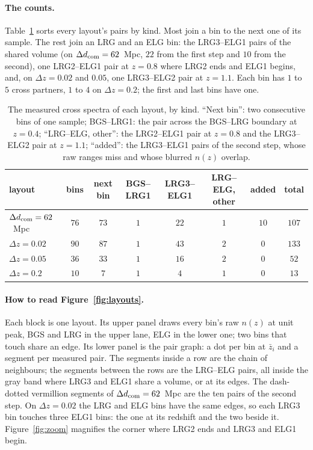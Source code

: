 \documentclass[11pt]{article}
\newcommand{\dcom}{$\Delta d_{\rm com} = 62$~Mpc}
\begin{document}
\paragraph{The counts.}
Table~\ref{tab:counts} sorts every layout's pairs by kind.  Most join a
bin to the next one of its sample.  The rest join an LRG and an ELG bin:
the LRG3--ELG1 pairs of the shared volume (on \dcom{}, $22$ from the
first step and $10$ from the second), one LRG2--ELG1 pair at $z = 0.8$
where LRG2 ends and ELG1 begins, and, on $\Delta z = 0.02$ and $0.05$,
one LRG3--ELG2 pair at $z = 1.1$.  Each bin has $1$ to $5$ cross
partners, $1$ to $4$ on $\Delta z = 0.2$; the first and last bins have
one.

\begin{table}[ht]
  \centering
  \small
  \setlength{\tabcolsep}{4.5pt}
  \begin{tabular}{lccccccc}
    \hline
    layout & bins & next bin & BGS--LRG1 & LRG3--ELG1 & LRG--ELG, other
      & added & total \\
    \hline
    \dcom{} & $76$ & $73$ & $1$ & $22$ & $1$ & $10$ & $107$ \\
    $\Delta z = 0.02$ & $90$ & $87$ & $1$ & $43$ & $2$ & $0$ & $133$ \\
    $\Delta z = 0.05$ & $36$ & $33$ & $1$ & $16$ & $2$ & $0$ & $52$ \\
    $\Delta z = 0.2$ & $10$ & $7$ & $1$ & $4$ & $1$ & $0$ & $13$ \\
    \hline
  \end{tabular}
  \caption{The measured cross spectra of each layout, by kind.
    ``Next bin'': two consecutive bins of one sample; BGS--LRG1: the
    pair across the BGS--LRG boundary at $z = 0.4$; ``LRG--ELG,
    other'': the LRG2--ELG1 pair at $z = 0.8$ and the LRG3--ELG2 pair at
    $z = 1.1$; ``added'': the LRG3--ELG1 pairs of the second step, whose
    raw ranges miss and whose blurred $n(z)$ overlap.}
  \label{tab:counts}
\end{table}

\paragraph{How to read Figure~\ref{fig:layouts}.}
Each block is one layout.  Its upper panel draws every bin's raw
$n(z)$ at unit peak, BGS and LRG in the upper lane, ELG in the lower
one; two bins that touch share an edge.  Its lower panel is the pair
graph: a dot per bin at $\bar{z}_i$ and a segment per measured pair.
The segments inside a row are the chain of neighbours; the segments
between the rows are the LRG--ELG pairs, all inside the gray band
where LRG3 and ELG1 share a volume, or at its edges.  The
dash-dotted vermillion segments of \dcom{} are the ten pairs of the
second step.  On $\Delta z = 0.02$ the LRG and ELG bins have the same
edges, so each
LRG3 bin touches three ELG1 bins: the one at its redshift and the two
beside it.  Figure~\ref{fig:zoom} magnifies the corner where LRG2 ends
and LRG3 and ELG1 begin.
\end{document}
